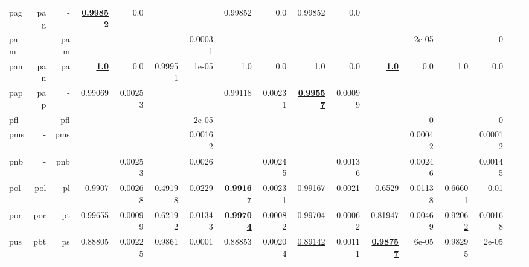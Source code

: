 \documentclass[11pt]{article}
\begin{document}
\begin{table*}[h]
{\begin{tabular}{lrrrrrrrrrrrrrrrr}
pag         & pag         & -         & \textbf{\underline{0.99852}}         & 0.0         &          &          & 0.99852         & 0.0         & 0.99852         & 0.0         &          &          &          &          \\
pam         & -         & pam         &          &          &          & 0.00031         &          &          &          &          &          & 2e-05         &          & 0         \\
pan         & pan         & pa         & \textbf{\underline{1.0}}         & 0.0         & 0.99951         & 1e-05         & 1.0         & 0.0         & 1.0         & 0.0         & \textbf{\underline{1.0}}         & 0.0         & 1.0         & 0.0         \\
pap         & pap         & -         & 0.99069         & 0.00253         &          &          & 0.99118         & 0.00231         & \textbf{\underline{0.99557}}         & 0.00099         &          &          &          &          \\
pfl         & -         & pfl         &          &          &          & 2e-05         &          &          &          &          &          & 0         &          & 0         \\
pms         & -         & pms         &          &          &          & 0.00162         &          &          &          &          &          & 0.00042         &          & 0.00012         \\
pnb         & -         & pnb         &          & 0.00253         &          & 0.0026         &          & 0.00245         &          & 0.00136         &          & 0.00246         &          & 0.00145         \\
pol         & pol         & pl         & 0.9907         & 0.00268         & 0.49198         & 0.0229         & \textbf{\underline{0.99167}}         & 0.00231         & 0.99167         & 0.0021         & 0.6529         & 0.01138         & \underline{0.66601}         & 0.01         \\
por         & por         & pt         & 0.99655         & 0.00099         & 0.62192         & 0.01343         & \textbf{\underline{0.99704}}         & 0.00082         & 0.99704         & 0.00062         & 0.81947         & 0.00469         & \underline{0.92062}         & 0.00168         \\
pus         & pbt         & ps         & 0.88805         & 0.00225         & 0.9861         & 0.0001         & 0.88853         & 0.00204         & \underline{0.89142}         & 0.00111         & \textbf{\underline{0.98757}}         & 6e-05         & 0.98295         & 2e-05         \\

\end{tabular}}
\end{table*}
\end{document}
